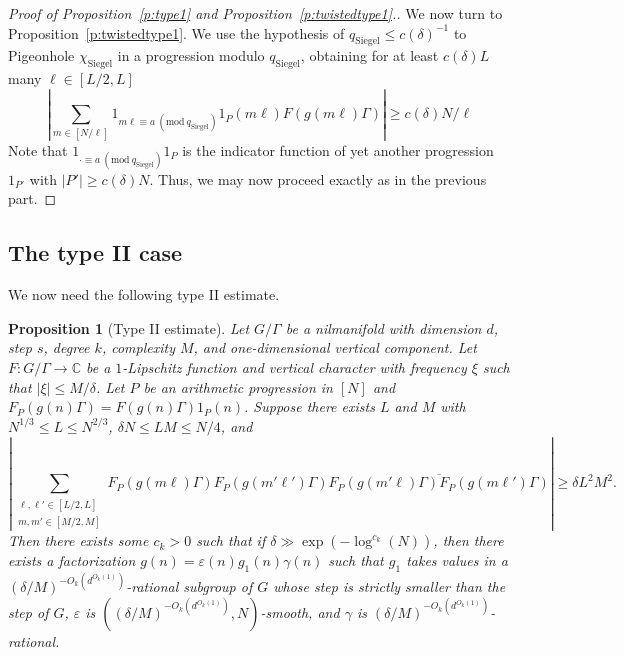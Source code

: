 \documentclass[11pt, a4paper]{amsart}
\newcommand{\nmod}[1]{~(\mathrm{mod}~#1)}
\theoremstyle{plain}
\theoremstyle{plain}
\newtheorem{proposition}{Proposition}
\theoremstyle{definition}
\theoremstyle{remark}
\numberwithin{equation}{section}
\numberwithin{lemma}{section}
\numberwithin{proposition}{section}
\numberwithin{corollary}{section}
\numberwithin{definition}{section}
\numberwithin{claim}{section}
\begin{document}
\begin{proof}[Proof of Proposition~\ref{p:type1} and Proposition~\ref{p:twistedtype1}.]
We now turn to Proposition~\ref{p:twistedtype1}. We use the hypothesis of $q_{\mathrm{Siegel}} \le c(\delta)^{-1}$ to Pigeonhole $\chi_{\mathrm{Siegel}}$ in a progression modulo $q_{\mathrm{Siegel}}$, obtaining for at least $c(\delta)L$ many $\ell \in [L/2, L]$ 
$$|\sum_{m \in [N/\ell]} 1_{m\ell \equiv a\nmod{q_{\mathrm{Siegel}}}}1_P(m\ell) F(g(m\ell)\Gamma)| \ge c(\delta)N/\ell$$
Note that $1_{\cdot \equiv a \nmod{q_{\mathrm{Siegel}}}}1_P$ is the indicator function of yet another progression $1_{P'}$ with $|P'| \ge c(\delta)N$. Thus, we may now proceed exactly as in the previous part.
\end{proof}


\subsection{The type II case}
We now need the following type II estimate.
\begin{proposition}[Type II estimate]\label{p:type2}
Let $G/\Gamma$ be a nilmanifold with dimension $d$, step $s$, degree $k$, complexity $M$, and one-dimensional vertical component. Let $F\colon G/\Gamma \to \mathbb{C}$ be a $1$-Lipschitz function and vertical character with frequency $\xi$ such that $|\xi| \le M/\delta$. Let $P$ be an arithmetic progression in $[N]$ and $F_P(g(n)\Gamma) = F(g(n)\Gamma)1_P(n)$. Suppose there exists $L$ and $M$ with $N^{1/3}\le L \le N^{2/3}$, $\delta N \le LM \le N/4$, and
\begin{equation}\label{e:maintype2inequality}
 \left|\sum_{\substack{\ell, \ell' \in [L/2, L] \\ m, m' \in [M/2, M]}}  F_P(g(m\ell)\Gamma)F_P(g(m'\ell')\Gamma)\overline{F_P(g(m'\ell)\Gamma)F_P(g(m\ell')\Gamma)} \right| \ge \delta L^2M^2.   
\end{equation}
Then there exists some $c_k > 0$ such that if $\delta \gg \exp(-\log^{c_k}(N))$, then there exists a factorization $g(n) = \varepsilon(n)g_1(n)\gamma(n)$ such that $g_1$ takes values in a $(\delta/M)^{-O_k(d^{O_k(1)})}$-rational subgroup of $G$ whose step is strictly smaller than the step of $G$, $\varepsilon$ is $((\delta/M)^{-O_k(d^{O_k(1)})}, N)$-smooth, and $\gamma$ is $(\delta/M)^{-O_k(d^{O_k(1)})}$-rational.
\end{proposition}
\end{document}
